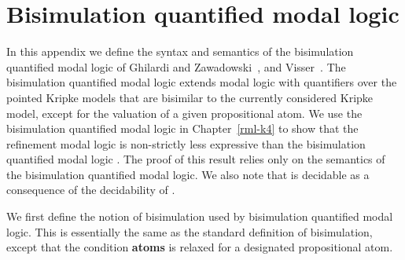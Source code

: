 \chapter{Bisimulation quantified modal logic}\label{bqml}

In this appendix we define the syntax and semantics of the bisimulation quantified modal logic of Ghilardi and Zawadowski~\cite{ghilardi:2002}, and Visser~\cite{visser:1996}.
The bisimulation quantified modal logic extends modal logic with quantifiers over the pointed Kripke models that are bisimilar to the currently considered Kripke model, except for the valuation of a given propositional atom.
We use the bisimulation quantified modal logic in Chapter~\ref{rml-k4} to show that the refinement modal logic \logicRmlKF{} is non-strictly less expressive than the bisimulation quantified modal logic \logicBqmlKF{}.
The proof of this result relies only on the semantics of the bisimulation quantified modal logic.
We also note that \logicRmlKF{} is decidable as a consequence of the decidability of \logicBqmlKF{}.

We first define the notion of bisimulation used by bisimulation quantified modal logic.
This is essentially the same as the standard definition of bisimulation, except that the condition {\bf atoms} is relaxed for a designated propositional atom.

